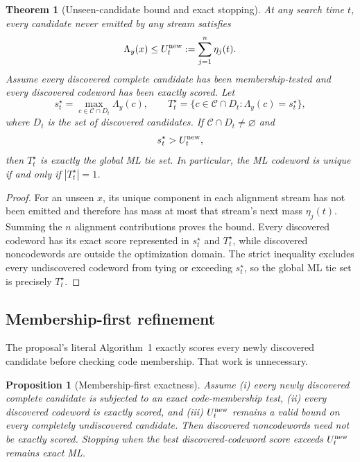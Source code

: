 \documentclass[11pt]{article}
\newtheorem{proposition}{Proposition}
\newtheorem{theorem}{Theorem}
\newcommand{\cC}{\mathcal C}
\begin{document}
\begin{theorem}[Unseen-candidate bound and exact stopping]
At any search time $t$, every candidate never emitted by any stream satisfies
\begin{equation}
\Lambda_y(x)\le U_t^{\rm new}:=\sum_{j=1}^n\eta_j(t).
\end{equation}
Assume every discovered complete candidate has been membership-tested and every discovered codeword has been exactly scored. Let
\begin{equation}
s_t^\star=\max_{c\in\cC\cap D_t}\Lambda_y(c),\qquad
T_t^\star=\{c\in\cC\cap D_t:\Lambda_y(c)=s_t^\star\},
\end{equation}
where $D_t$ is the set of discovered candidates. If $\cC\cap D_t\neq\varnothing$ and
\begin{equation}
s_t^\star>U_t^{\rm new},
\end{equation}
then $T_t^\star$ is exactly the global ML tie set. In particular, the ML codeword is unique if and only if $|T_t^\star|=1$.
\end{theorem}

\begin{proof}
For an unseen $x$, its unique component in each alignment stream has not been emitted and therefore has mass at most that stream's next mass $\eta_j(t)$. Summing the $n$ alignment contributions proves the bound. Every discovered codeword has its exact score represented in $s_t^\star$ and $T_t^\star$, while discovered noncodewords are outside the optimization domain. The strict inequality excludes every undiscovered codeword from tying or exceeding $s_t^\star$, so the global ML tie set is precisely $T_t^\star$.
\end{proof}

\subsection{Membership-first refinement}
The proposal's literal Algorithm~1 exactly scores every newly discovered candidate before checking code membership. That work is unnecessary.

\begin{proposition}[Membership-first exactness]
Assume (i) every newly discovered complete candidate is subjected to an exact code-membership test, (ii) every discovered codeword is exactly scored, and (iii) $U_t^{\rm new}$ remains a valid bound on every completely undiscovered candidate. Then discovered noncodewords need not be exactly scored. Stopping when the best discovered-codeword score exceeds $U_t^{\rm new}$ remains exact ML.
\end{proposition}
\end{document}
